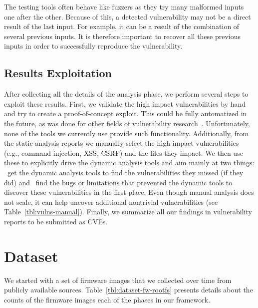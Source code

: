 \documentclass[conference]{./templates/ndss/IEEEtran}
\newcounter{t0d0_counter}
\newcounter{pr00f_counter}
\begin{document}
The testing tools often behave like fuzzers as they try many malformed 
inputs one after the other. Because of this, a detected vulnerability
may not be a direct result of the last input. For example, it can be a
result of the combination of several previous inputs.  It is therefore
important to recover all these previous inputs in order to successfully reproduce
the vulnerability. 


\subsection{Results Exploitation}
\label{sec:results-exploitation}

After collecting all the details of the analysis phase, we perform several
steps to exploit these results.  
First, we validate the high impact vulnerabilities by hand and try to create a
proof-of-concept exploit. This could be fully automatized in the future, as
was done for other fields of vulnerability research~\cite{avgerinos2011aeg}. 
Unfortunately, none of the tools we currently use provide such functionality. 
Additionally, from the static analysis reports we manually select the high 
impact vulnerabilities (e.g., command injection, XSS, CSRF) 
and the files they impact.  We then use these to explicitly drive the dynamic analysis tools and
aim mainly at two things: ~get the dynamic analysis tools to find
the vulnerabilities they missed (if they did) and ~find the
bugs or limitations that prevented the dynamic tools to discover these vulnerabilities in the
first place. 
Even though manual analysis does not scale, it can help uncover additional nontrivial vulnerabilities (see
Table~\ref{tbl:vulns-manual}).
Finally, we summarize all our findings in vulnerability reports to be
submitted as CVEs. 



\section{Dataset}
\label{sec:dataset}



We started with a set of firmware images that we collected over time 
from publicly available sources. 
Table~\ref{tbl:dataset-fw-rootfs} presents details about the counts of 
the firmware images each of the phases in our framework. 
\end{document}
